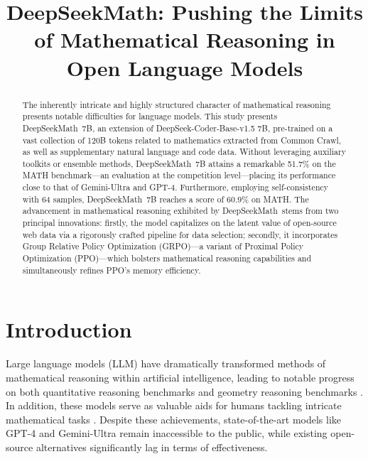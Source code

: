 \title{DeepSeekMath: Pushing the Limits of Mathematical Reasoning in Open Language Models}

\begin{abstract}
The inherently intricate and highly structured character of mathematical reasoning presents notable difficulties for language models. This study presents DeepSeekMath~7B, an extension of DeepSeek-Coder-Base-v1.5 7B, pre-trained on a vast collection of 120B tokens related to mathematics extracted from Common Crawl, as well as supplementary natural language and code data. Without leveraging auxiliary toolkits or ensemble methods, DeepSeekMath~7B attains a remarkable 51.7\% on the MATH benchmark—an evaluation at the competition level—placing its performance close to that of Gemini-Ultra and GPT-4. Furthermore, employing self-consistency with 64 samples, DeepSeekMath~7B reaches a score of 60.9\% on MATH. The advancement in mathematical reasoning exhibited by DeepSeekMath~stems from two principal innovations: firstly, the model capitalizes on the latent value of open-source web data via a rigorously crafted pipeline for data selection; secondly, it incorporates Group Relative Policy Optimization (GRPO)—a variant of Proximal Policy Optimization (PPO)—which bolsters mathematical reasoning capabilities and simultaneously refines PPO’s memory efficiency.
\end{abstract}

\section{Introduction}

Large language models (LLM) have dramatically transformed methods of mathematical reasoning within artificial intelligence, leading to notable progress on both quantitative reasoning benchmarks \citep{MATH} and geometry reasoning benchmarks \citep{trinh2024solving}. In addition, these models serve as valuable aids for humans tackling intricate mathematical tasks \citep{tao}. Despite these achievements, state-of-the-art models like GPT-4 \citep{gpt4} and Gemini-Ultra \citep{gemini} remain inaccessible to the public, while existing open-source alternatives significantly lag in terms of effectiveness.

